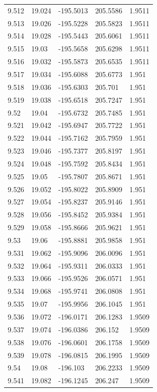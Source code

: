 \begin{tabular}{lllll}
9.512 & 19.024 & -195.5013 & 205.5586 & 1.9511 \\
9.513 & 19.026 & -195.5228 & 205.5823 & 1.9511 \\
9.514 & 19.028 & -195.5443 & 205.6061 & 1.9511 \\
9.515 & 19.03 & -195.5658 & 205.6298 & 1.9511 \\
9.516 & 19.032 & -195.5873 & 205.6535 & 1.9511 \\
9.517 & 19.034 & -195.6088 & 205.6773 & 1.951 \\
9.518 & 19.036 & -195.6303 & 205.701 & 1.951 \\
9.519 & 19.038 & -195.6518 & 205.7247 & 1.951 \\
9.52 & 19.04 & -195.6732 & 205.7485 & 1.951 \\
9.521 & 19.042 & -195.6947 & 205.7722 & 1.951 \\
9.522 & 19.044 & -195.7162 & 205.7959 & 1.951 \\
9.523 & 19.046 & -195.7377 & 205.8197 & 1.951 \\
9.524 & 19.048 & -195.7592 & 205.8434 & 1.951 \\
9.525 & 19.05 & -195.7807 & 205.8671 & 1.951 \\
9.526 & 19.052 & -195.8022 & 205.8909 & 1.951 \\
9.527 & 19.054 & -195.8237 & 205.9146 & 1.951 \\
9.528 & 19.056 & -195.8452 & 205.9384 & 1.951 \\
9.529 & 19.058 & -195.8666 & 205.9621 & 1.951 \\
9.53 & 19.06 & -195.8881 & 205.9858 & 1.951 \\
9.531 & 19.062 & -195.9096 & 206.0096 & 1.951 \\
9.532 & 19.064 & -195.9311 & 206.0333 & 1.951 \\
9.533 & 19.066 & -195.9526 & 206.0571 & 1.951 \\
9.534 & 19.068 & -195.9741 & 206.0808 & 1.951 \\
9.535 & 19.07 & -195.9956 & 206.1045 & 1.951 \\
9.536 & 19.072 & -196.0171 & 206.1283 & 1.9509 \\
9.537 & 19.074 & -196.0386 & 206.152 & 1.9509 \\
9.538 & 19.076 & -196.0601 & 206.1758 & 1.9509 \\
9.539 & 19.078 & -196.0815 & 206.1995 & 1.9509 \\
9.54 & 19.08 & -196.103 & 206.2233 & 1.9509 \\
9.541 & 19.082 & -196.1245 & 206.247 & 1.9509 \\

\end{tabular}
